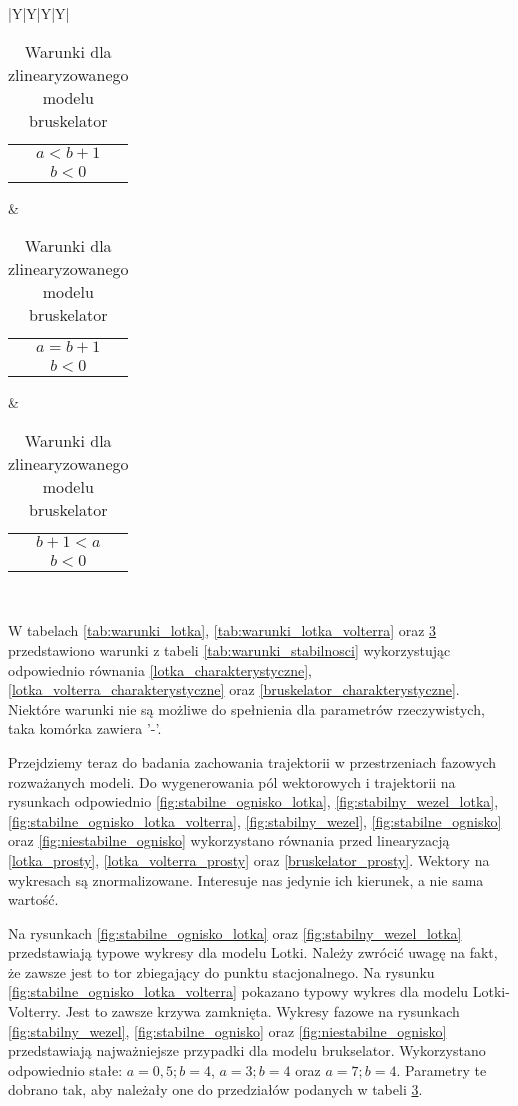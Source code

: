\documentclass[10pt, a4paper, twoside, onecolumn]{article}
\numberwithin{equation}{section}
\begin{document}
\begin{table}[H]
\begin{tabularx}{\textwidth}{|Y|Y|Y|Y|}
{\begin{tabularx}{\columnwidth}{c}
				\(a<b+1\) \\
				\(b<0\)
			\end{tabularx}}
			& 
			{\begin{tabularx}{\columnwidth}{c} %
				\(a=b+1\) \\
				\(b<0\)
			\end{tabularx}}
			&
			{\begin{tabularx}{\columnwidth}{c} %
				\(b+1<a\) \\
				\(b<0\)
			\end{tabularx}}
			\\ 
		\end{tabularx}
		\caption{Warunki dla zlinearyzowanego modelu bruskelator}
		\label{tab:warunki_bruskelator}
	\end{table}
	W tabelach \ref{tab:warunki_lotka}, \ref{tab:warunki_lotka_volterra} oraz \ref{tab:warunki_bruskelator} przedstawiono warunki z tabeli \ref{tab:warunki_stabilnosci} wykorzystując odpowiednio równania \eqref{lotka_charakterystyczne}, \eqref{lotka_volterra_charakterystyczne} oraz \eqref{bruskelator_charakterystyczne}. Niektóre warunki nie są możliwe do spełnienia dla parametrów rzeczywistych, taka komórka zawiera '-'. \par
	Przejdziemy teraz do badania zachowania trajektorii w przestrzeniach fazowych rozważanych modeli. Do wygenerowania pól wektorowych i trajektorii na rysunkach odpowiednio \ref{fig:stabilne_ognisko_lotka}, \ref{fig:stabilny_wezel_lotka}, \ref{fig:stabilne_ognisko_lotka_volterra}, \ref{fig:stabilny_wezel}, \ref{fig:stabilne_ognisko} oraz \ref{fig:niestabilne_ognisko} wykorzystano równania przed linearyzacją \eqref{lotka_prosty}, \eqref{lotka_volterra_prosty} oraz \eqref{bruskelator_prosty}. Wektory na wykresach są znormalizowane. Interesuje nas jedynie ich kierunek, a nie sama wartość. \par
	Na rysunkach \ref{fig:stabilne_ognisko_lotka} oraz \ref{fig:stabilny_wezel_lotka} przedstawiają typowe wykresy dla modelu Lotki. Należy zwrócić uwagę na fakt, że zawsze jest to tor zbiegający do punktu stacjonalnego. Na rysunku \ref{fig:stabilne_ognisko_lotka_volterra} pokazano typowy wykres dla modelu Lotki-Volterry. Jest to zawsze krzywa zamknięta. Wykresy fazowe na rysunkach \ref{fig:stabilny_wezel}, \ref{fig:stabilne_ognisko} oraz \ref{fig:niestabilne_ognisko} przedstawiają najważniejsze przypadki dla modelu brukselator. Wykorzystano odpowiednio stałe: \(a=0,5; b=4\), \(a=3; b=4\) oraz \(a=7; b=4\). Parametry te dobrano tak, aby należały one do przedziałów podanych w tabeli \ref{tab:warunki_bruskelator}. \par
\end{document}
